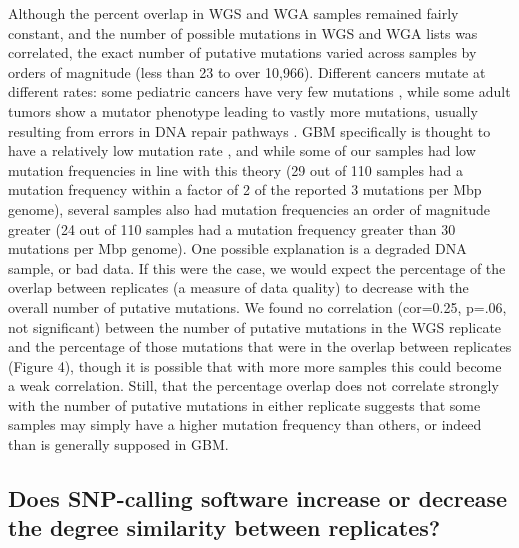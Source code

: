 \documentclass[11pt]{article} %
\begin{document}
Although the percent overlap in WGS and WGA samples remained fairly constant, and the number of possible mutations in WGS and WGA lists was correlated, the exact number of putative mutations varied across samples by orders of magnitude (less than 23 to over 10,966). Different cancers mutate at different rates: some pediatric cancers have very few mutations \citep{RB2hit, pediatric}, while some adult tumors show a mutator phenotype leading to vastly more mutations, usually resulting from errors in DNA repair pathways \citep{mutator}. GBM specifically is thought to have a relatively low mutation rate \citep{Parsons, TCGA-GBM-13}, and while some of our samples had low mutation frequencies in line with this theory (29 out of 110 samples had a mutation frequency within a factor of 2 of the reported 3 mutations per Mbp genome), several samples also had mutation frequencies an order of magnitude greater (24 out of 110 samples had a mutation frequency greater than 30 mutations per Mbp genome). One possible explanation is a degraded DNA sample, or bad data. If this were the case, we would expect the percentage of the overlap between replicates (a measure of data quality) to decrease with the overall number of putative mutations. We found no correlation (cor=0.25, p=.06, not significant) between the number of putative mutations in the WGS replicate and the percentage of those mutations that were in the overlap between replicates (Figure 4), though it is possible that with more more samples this could become a weak correlation. Still, that the percentage overlap does not correlate strongly with the number of putative mutations in either replicate suggests that some samples may simply have a higher mutation frequency than others, or indeed than is generally supposed in GBM.

\subsection*{Does SNP-calling software increase or decrease the degree similarity between replicates?}
\end{document}
